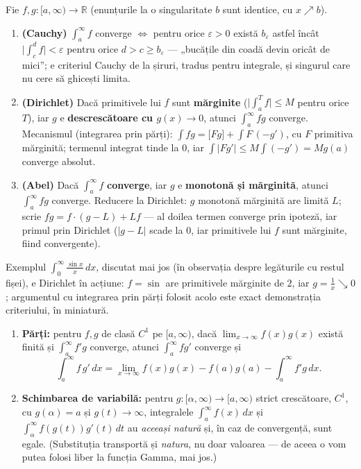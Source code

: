 \begin{teorema}
Fie $f,g:[a,\infty)\to\mathbb{R}$ (enunțurile la o singularitate $b$ sunt identice, cu $x\nearrow b$).
\begin{enumerate}[leftmargin=*, itemsep=2pt]
\item \textbf{(Cauchy)} $\int_a^\infty f$ converge $\iff$ pentru orice $\varepsilon>0$ există $b_\varepsilon$ astfel încât $\big|\int_c^d f\big|<\varepsilon$ pentru orice $d>c\ge b_\varepsilon$ --- „bucățile din coadă devin oricât de mici''; e criteriul Cauchy de la șiruri, tradus pentru integrale, și singurul care nu cere să ghicești limita.
\item \textbf{(Dirichlet)} Dacă primitivele lui $f$ sunt \textbf{mărginite} ($\big|\int_a^T f\big|\le M$ pentru orice $T$), iar $g$ e \textbf{descrescătoare cu $g(x)\to0$}, atunci $\int_a^\infty fg$ converge. Mecanismul (integrarea prin părți): $\int fg=\big[Fg\big]+\int F\,(-g')$, cu $F$ primitiva mărginită; termenul integrat tinde la $0$, iar $\int|F g'|\le M\int(-g')=M g(a)$ converge absolut.
\item \textbf{(Abel)} Dacă $\int_a^\infty f$ \textbf{converge}, iar $g$ e \textbf{monotonă și mărginită}, atunci $\int_a^\infty fg$ converge. Reducere la Dirichlet: $g$ monotonă mărginită are limită $L$; scrie $fg=f\cdot(g-L)+L f$ --- al doilea termen converge prin ipoteză, iar primul prin Dirichlet ($|g-L|$ scade la $0$, iar primitivele lui $f$ sunt mărginite, fiind convergente).
\end{enumerate}
Exemplul $\int_0^\infty\frac{\sin x}{x}\,dx$, discutat mai jos (în observația despre legăturile cu restul fișei), e Dirichlet în acțiune: $f=\sin$ are primitivele mărginite de $2$, iar $g=\frac1x\searrow0$; argumentul cu integrarea prin părți folosit acolo este exact demonstrația criteriului, în miniatură.
\end{teorema}

\begin{teorema}
\begin{enumerate}[leftmargin=*, itemsep=2pt]
\item \textbf{Părți:} pentru $f,g$ de clasă $C^1$ pe $[a,\infty)$, dacă $\lim_{x\to\infty}f(x)g(x)$ există finită și $\int_a^\infty f'g$ converge, atunci $\int_a^\infty fg'$ converge și
\[
\int_a^\infty f\,g'\,dx=\lim_{x\to\infty}f(x)g(x)-f(a)g(a)-\int_a^\infty f'g\,dx.
\]
\item \textbf{Schimbarea de variabilă:} pentru $g:[\alpha,\infty)\to[a,\infty)$ strict crescătoare, $C^1$, cu $g(\alpha)=a$ și $g(t)\to\infty$, integralele $\int_a^\infty f(x)\,dx$ și $\int_\alpha^\infty f(g(t))g'(t)\,dt$ au \emph{aceeași natură} și, în caz de convergență, sunt egale. (Substituția transportă și \emph{natura}, nu doar valoarea --- de aceea o vom putea folosi liber la funcția Gamma, mai jos.)
\end{enumerate}
\end{teorema}

